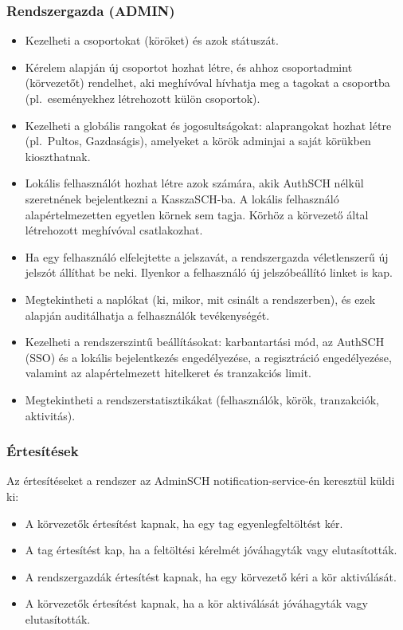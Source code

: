 \subsubsection{Rendszergazda (ADMIN)}

\begin{itemize}
	\item Kezelheti a csoportokat (köröket) és azok státuszát.
	\item Kérelem alapján új csoportot hozhat létre, és ahhoz csoportadmint (körvezetőt) rendelhet, aki meghívóval hívhatja meg a tagokat a csoportba (pl.\ eseményekhez létrehozott külön csoportok).
	\item Kezelheti a globális rangokat és jogosultságokat: alaprangokat hozhat létre (pl.\ Pultos, Gazdaságis), amelyeket a körök adminjai a saját körükben kioszthatnak.
	\item Lokális felhasználót hozhat létre azok számára, akik AuthSCH nélkül szeretnének bejelentkezni a KasszaSCH-ba. A lokális felhasználó alapértelmezetten egyetlen körnek sem tagja. Körhöz a körvezető által létrehozott meghívóval csatlakozhat.
	\item Ha egy felhasználó elfelejtette a jelszavát, a rendszergazda véletlenszerű új jelszót állíthat be neki. Ilyenkor a felhasználó új jelszóbeállító linket is kap.
	\item Megtekintheti a naplókat (ki, mikor, mit csinált a rendszerben), és ezek alapján auditálhatja a felhasználók tevékenységét.
	\item Kezelheti a rendszerszintű beállításokat: karbantartási mód, az AuthSCH (SSO) és a lokális bejelentkezés engedélyezése, a regisztráció engedélyezése, valamint az alapértelmezett hitelkeret és tranzakciós limit.
	\item Megtekintheti a rendszerstatisztikákat (felhasználók, körök, tranzakciók, aktivitás).
\end{itemize}

\subsubsection{Értesítések}

Az értesítéseket a rendszer az AdminSCH notification-service-én keresztül küldi ki:

\begin{itemize}
	\item A körvezetők értesítést kapnak, ha egy tag egyenlegfeltöltést kér.
	\item A tag értesítést kap, ha a feltöltési kérelmét jóváhagyták vagy elutasították.
	\item A rendszergazdák értesítést kapnak, ha egy körvezető kéri a kör aktiválását.
	\item A körvezetők értesítést kapnak, ha a kör aktiválását jóváhagyták vagy elutasították.
\end{itemize}

